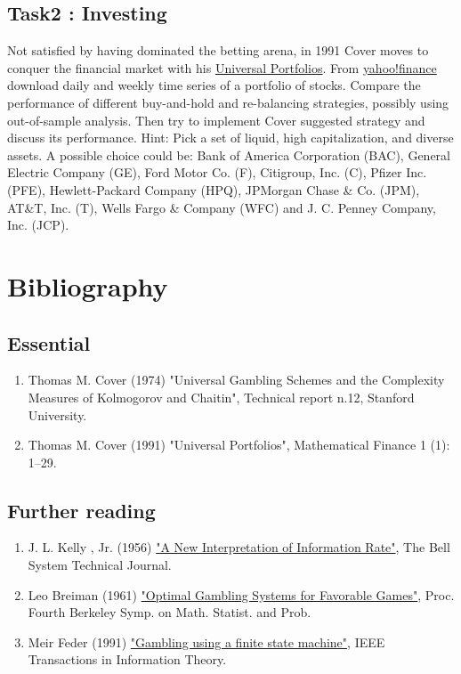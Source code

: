 \documentclass[11pt]{article}
\begin{document}
\subsection{Task2 : Investing}
\label{sec-2-2}

Not satisfied by having dominated the betting arena, in 1991 Cover
moves to conquer the financial market with his \href{https://drive.google.com/file/d/0B3G1Di9qZKBmMFRHMkRmZGJ4R00/view?usp=sharing}{Universal
Portfolios}. From \href{http://finance.yahoo.com/}{yahoo!finance} download daily and weekly time series
of a portfolio of stocks. Compare the performance of different
buy-and-hold and re-balancing strategies, possibly using out-of-sample
analysis. Then try to implement Cover suggested strategy and discuss
its performance. Hint: Pick a set of liquid, high capitalization, and
diverse assets. A possible choice could be: Bank of America
Corporation (BAC), General Electric Company (GE), Ford Motor Co. (F),
Citigroup, Inc. (C), Pfizer Inc. (PFE), Hewlett-Packard Company (HPQ),
JPMorgan Chase \& Co. (JPM), AT\&T, Inc. (T), Wells Fargo \& Company
(WFC) and J. C. Penney Company, Inc. (JCP).

\section{Bibliography}
\label{sec-3}

\subsection{Essential}
\label{sec-3-1}

\begin{enumerate}
\item Thomas M. Cover (1974) "Universal Gambling Schemes and the
Complexity Measures of Kolmogorov and Chaitin", Technical report
n.12, Stanford University.

\item Thomas M. Cover (1991) "Universal Portfolios", Mathematical Finance
1 (1): 1–29.
\end{enumerate}
\subsection{Further reading}
\label{sec-3-2}

\begin{enumerate}
\item J. L. Kelly , Jr. (1956) \href{https://drive.google.com/file/d/0B3G1Di9qZKBmdUpUZDNDOG83eHM/view?usp=sharing}{"A New Interpretation of Information Rate"},
The Bell System Technical Journal.

\item Leo Breiman (1961) \href{https://drive.google.com/file/d/0B3G1Di9qZKBmbXotb21Od08wdjA/view?usp=sharing}{"Optimal Gambling Systems for Favorable Games"},
Proc. Fourth Berkeley Symp. on Math. Statist. and Prob.

\item Meir Feder (1991) \href{https://drive.google.com/file/d/0B3G1Di9qZKBmNUVKQm5pU0ZSUmM/view?usp=sharing}{"Gambling using a finite state machine"}, IEEE
Transactions in Information Theory.
\end{enumerate}
\end{document}
